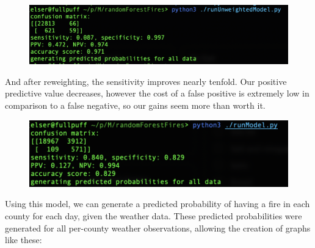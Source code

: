 \documentclass{article}
\begin{document}
\begin{figure}[H]
	\includegraphics[width=\linewidth]{images/runUnweightedModelScreenshot.png}
\end{figure}
And after reweighting, the sensitivity improves nearly tenfold. Our positive predictive value decreases, however the cost of a false positive is extremely low in comparison to a false negative, so our gains seem more than worth it. 
\begin{figure}[H]
	\includegraphics[width=\linewidth]{images/runModelScreenshot.png}
\end{figure}
Using this model, we can generate a predicted probability of having a fire in each county for each day, given the weather data. These predicted probabilities were generated for all per-county weather observations, allowing the creation of graphs like these:
\end{document}
